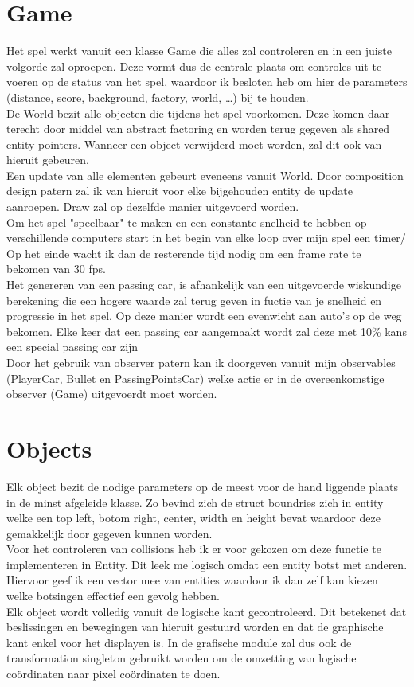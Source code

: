 \documentclass[12pt,a4paper]{article}
\begin{document}
\section{Game}
Het spel werkt vanuit een klasse Game die alles zal controleren en in een juiste volgorde zal oproepen. Deze vormt dus de centrale plaats om controles uit te voeren op de status van het spel, waardoor ik besloten heb om hier de parameters (distance, score, background, factory, world, \ldots) bij te houden.\\
De World bezit alle objecten die tijdens het spel voorkomen. Deze komen daar terecht door middel van abstract factoring en worden terug gegeven als shared entity pointers. Wanneer een object verwijderd moet worden, zal dit ook van hieruit gebeuren.\\
Een update van alle elementen gebeurt eveneens vanuit World. Door composition design patern zal ik van hieruit voor elke bijgehouden entity de update aanroepen. Draw zal op dezelfde manier uitgevoerd worden.\\
\linebreak
Om het spel "speelbaar" te maken en een constante snelheid te hebben op verschillende computers start in het begin van elke loop over mijn spel een timer/ Op het einde wacht ik dan de resterende tijd nodig om een frame rate te bekomen van 30 fps.\\
Het genereren van een passing car, is afhankelijk van een uitgevoerde wiskundige berekening die een hogere waarde zal terug geven in fuctie van je snelheid en progressie in het spel. Op deze manier wordt een evenwicht aan auto's op de weg bekomen. Elke keer dat een passing car aangemaakt wordt zal deze met 10\% kans een special passing car zijn\\
\linebreak
Door het gebruik van observer patern kan ik doorgeven vanuit mijn observables (PlayerCar, Bullet en PassingPointsCar) welke actie er in de overeenkomstige observer (Game) uitgevoerdt moet worden.
\newpage

\section{Objects}
Elk object bezit de nodige parameters op de meest voor de hand liggende plaats in de minst afgeleide klasse. Zo bevind zich de struct boundries zich in entity welke een top left, botom right, center, width en height bevat waardoor deze gemakkelijk door gegeven kunnen worden.\\
Voor het controleren van collisions heb ik er voor gekozen om deze functie te implementeren in Entity. Dit leek me logisch omdat een entity botst met anderen. Hiervoor geef ik een vector mee van entities waardoor ik dan zelf kan kiezen welke botsingen effectief een gevolg hebben.\\
Elk object wordt volledig vanuit de logische kant gecontroleerd. Dit betekenet dat beslissingen en bewegingen van hieruit gestuurd worden en dat de graphische kant enkel voor het displayen is. In de grafische module zal dus ook de transformation singleton gebruikt worden om de omzetting van logische co\"ordinaten naar pixel co\"ordinaten te doen.
\end{document}
